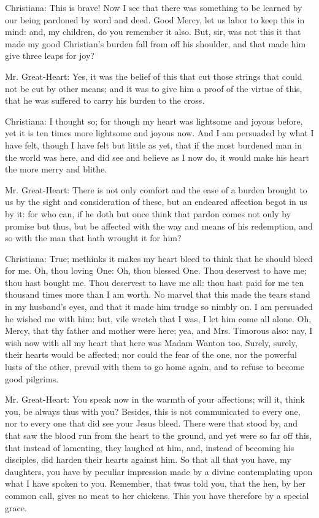 Christiana: This is brave! Now I see that there was something to be learned by our being pardoned by word and deed. Good Mercy, let us labor to keep this in mind: and, my children, do you remember it also. But, sir, was not this it that made my good Christian's burden fall from off his shoulder, and that made him give three leaps for joy?

Mr. Great-Heart: Yes, it was the belief of this that cut those strings that could not be cut by other means; and it was to give him a proof of the virtue of this, that he was suffered to carry his burden to the cross.

Christiana: I thought so; for though my heart was lightsome and joyous before, yet it is ten times more lightsome and joyous now. And I am persuaded by what I have felt, though I have felt but little as yet, that if the most burdened man in the world was here, and did see and believe as I now do, it would make his heart the more merry and blithe.

Mr. Great-Heart: There is not only comfort and the ease of a burden brought to us by the sight and consideration of these, but an endeared affection begot in us by it: for who can, if he doth but once think that pardon comes not only by promise but thus, but be affected with the way and means of his redemption, and so with the man that hath wrought it for him?

Christiana: True; methinks it makes my heart bleed to think that he should bleed for me. Oh, thou loving One: Oh, thou blessed One. Thou deservest to have me; thou hast bought me. Thou deservest to have me all: thou hast paid for me ten thousand times more than I am worth. No marvel that this made the tears stand in my husband's eyes, and that it made him trudge so nimbly on. I am persuaded he wished me with him: but, vile wretch that I was, I let him come all alone. Oh, Mercy, that thy father and mother were here; yea, and Mrs. Timorous also: nay, I wish now with all my heart that here was Madam Wanton too. Surely, surely, their hearts would be affected; nor could the fear of the one, nor the powerful lusts of the other, prevail with them to go home again, and to refuse to become good pilgrims.

Mr. Great-Heart: You speak now in the warmth of your affections; will it, think you, be always thus with you? Besides, this is not communicated to every one, nor to every one that did see your Jesus bleed. There were that stood by, and that saw the blood run from the heart to the ground, and yet were so far off this, that instead of lamenting, they laughed at him, and, instead of becoming his disciples, did harden their hearts against him. So that all that you have, my daughters, you have by peculiar impression made by a divine contemplating upon what I have spoken to you. Remember, that twas told you, that the hen, by her common call, gives no meat to her chickens. This you have therefore by a special grace.

